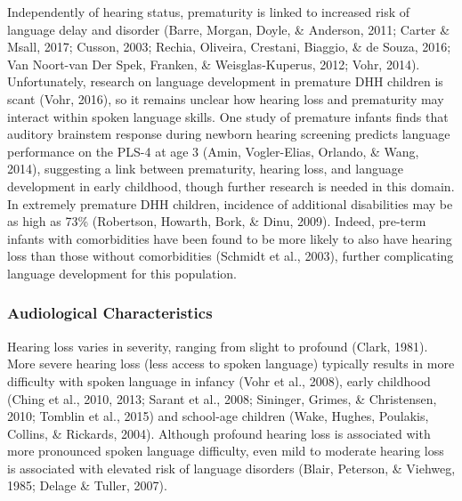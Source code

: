 \documentclass[english,man]{apa6}
\begin{document}
Independently of hearing status, prematurity is linked to increased risk of language delay and disorder (Barre, Morgan, Doyle, \& Anderson, 2011; Carter \& Msall, 2017; Cusson, 2003; Rechia, Oliveira, Crestani, Biaggio, \& de Souza, 2016; Van Noort-van Der Spek, Franken, \& Weisglas-Kuperus, 2012; Vohr, 2014). Unfortunately, research on language development in premature DHH children is scant (Vohr, 2016), so it remains unclear how hearing loss and prematurity may interact within spoken language skills. One study of premature infants finds that auditory brainstem response during newborn hearing screening predicts language performance on the PLS-4 at age 3 (Amin, Vogler-Elias, Orlando, \& Wang, 2014), suggesting a link between prematurity, hearing loss, and language development in early childhood, though further research is needed in this domain. In extremely premature DHH children, incidence of additional disabilities may be as high as 73\% (Robertson, Howarth, Bork, \& Dinu, 2009). Indeed, pre-term infants with comorbidities have been found to be more likely to also have hearing loss than those without comorbidities (Schmidt et al., 2003), further complicating language development for this population.

\hypertarget{audiological-characteristics}{%
\subsubsection{Audiological Characteristics}\label{audiological-characteristics}}

Hearing loss varies in severity, ranging from slight to profound (Clark, 1981). More severe hearing loss (less access to spoken language) typically results in more difficulty with spoken language in infancy (Vohr et al., 2008), early childhood (Ching et al., 2010, 2013; Sarant et al., 2008; Sininger, Grimes, \& Christensen, 2010; Tomblin et al., 2015) and school-age children (Wake, Hughes, Poulakis, Collins, \& Rickards, 2004). Although profound hearing loss is associated with more pronounced spoken language difficulty, even mild to moderate hearing loss is associated with elevated risk of language disorders (Blair, Peterson, \& Viehweg, 1985; Delage \& Tuller, 2007).
\end{document}
